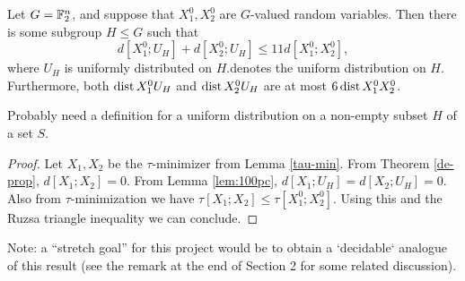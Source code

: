 \begin{theorem}\label{entropy-pfr}
  Let $G = \mathbb{F}_2^n$, and suppose that $X^0_1, X^0_2$ are $G$-valued random variables.
  Then there is some subgroup $H \leq G$ such that
  \[
    d[X^0_1;U_H] + d[X^0_2;U_H] \le 11 d[X^0_1;X^0_2],
  \]
  where $U_H$ is uniformly distributed on $H$.denotes the uniform distribution on $H$.
  Furthermore, both $\operatorname{dist}{X^0_1}{U_H}$ and $\operatorname{dist}{X^0_2}{U_H}$ are at most $6 \operatorname{dist}{X^0_1}{X^0_2}$.
\end{theorem}

Probably need a definition for a uniform distribution on a non-empty subset $H$ of a set $S$.

\begin{proof}   Let $X_1, X_2$ be the $\tau$-minimizer from Lemma \ref{tau-min}.  From Theorem \ref{de-prop}, $d[X_1;X_2]=0$.  From Lemma \ref{lem:100pc}, $d[X_1;U_H] = d[X_2; U_H] = 0$.  Also from $\tau$-minimization we have $\tau[X_1;X_2] \leq \tau[X^0_1;X^0_2]$.  Using this and the Ruzsa triangle inequality we can conclude.
\end{proof}

Note: a ``stretch goal'' for this project would be to obtain a `decidable` analogue of this result (see the remark at the end of Section 2 for some related discussion).
